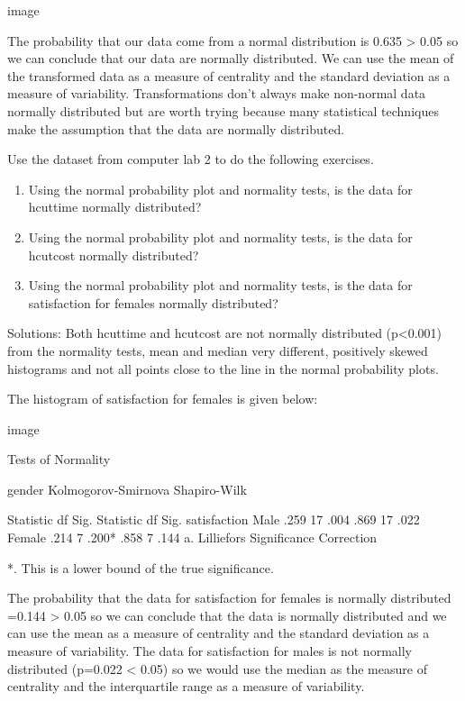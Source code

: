 image
 
 
The probability that our data come from a normal distribution is 0.635 > 0.05 so we can conclude that our data are normally distributed. We can use the mean of the transformed data as a measure of centrality and the standard deviation as a measure of variability. Transformations don’t always make non-normal data normally distributed but are worth trying because many statistical techniques make the assumption that the data are normally distributed.
 
 
Use the dataset from computer lab 2 to do the following exercises.
\begin{enumerate}
\item Using the normal probability plot and normality tests, is the data for hcuttime normally distributed?
\item Using the normal probability plot and normality tests, is the data for hcutcost normally distributed?
\item Using the normal probability plot and normality tests, is the data for satisfaction for females normally distributed?
\end{enumerate} 
 
 
 
Solutions: Both hcuttime and hcutcost are not normally distributed (p<0.001) from the normality tests, mean and median very different, positively skewed histograms and not all points close to the line in the normal probability plots.
 
 
The histogram of satisfaction for females is given below:
 
image
 
 
Tests of Normality
 	
gender
Kolmogorov-Smirnova
Shapiro-Wilk
 	
Statistic
df
Sig.
Statistic
df
Sig.
satisfaction
Male
.259
17
.004
.869
17
.022
Female
.214
7
.200*
.858
7
.144
a. Lilliefors Significance Correction
 	 	 	 
*. This is a lower bound of the true significance.
 	 	 
 
The probability that the data for satisfaction for females is normally distributed =0.144 > 0.05 so we can conclude that the data is normally distributed and we can use the mean as a measure of centrality and the standard deviation as a measure of variability. The data for satisfaction for males is not normally distributed (p=0.022 < 0.05) so we would use the median as the measure of centrality and the interquartile range as a measure of variability.

